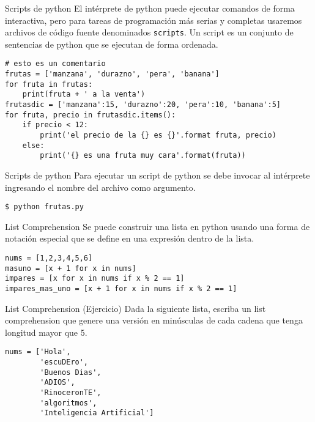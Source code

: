 \documentclass[10pt]{beamer}
\begin{document}
\begin{frame}[fragile]{Scripts de python}
El intérprete de python puede ejecutar comandos de forma interactiva, pero para 
tareas de programación más serias y completas usaremos archivos de código fuente 
denominados \texttt{scripts}.
Un script es un conjunto de sentencias de python que se ejecutan de forma ordenada.

\begin{lstlisting}
# esto es un comentario
frutas = ['manzana', 'durazno', 'pera', 'banana']
for fruta in frutas:
    print(fruta + ' a la venta')
frutasdic = ['manzana':15, 'durazno':20, 'pera':10, 'banana':5]
for fruta, precio in frutasdic.items():
    if precio < 12:
        print('el precio de la {} es {}'.format fruta, precio)
    else:
        print('{} es una fruta muy cara'.format(fruta))
\end{lstlisting}
\end{frame}

\begin{frame}[fragile]{Scripts de python}
Para ejecutar un script de python se debe invocar al intérprete 
ingresando el nombre del archivo como argumento.
\begin{lstlisting}
$ python frutas.py
\end{lstlisting}
\end{frame}

\begin{frame}[fragile]{List Comprehension}
Se puede construir una lista en python usando una forma de notación especial que se  define en 
una expresión dentro de la lista.
\begin{lstlisting}
nums = [1,2,3,4,5,6]
masuno = [x + 1 for x in nums]
impares = [x for x in nums if x % 2 == 1]
impares_mas_uno = [x + 1 for x in nums if x % 2 == 1]
\end{lstlisting}
\end{frame}

\begin{frame}[fragile]{List Comprehension (Ejercicio)}
Dada la siguiente lista, escriba un list comprehension que genere una versión en 
minúsculas de cada cadena que tenga longitud mayor que 5.
\begin{lstlisting}
nums = ['Hola',
        'escuDEro',
        'Buenos Dias',
        'ADIOS',
        'RinoceronTE',
        'algoritmos',
        'Inteligencia Artificial']
\end{lstlisting}
\end{frame}
\end{document}
